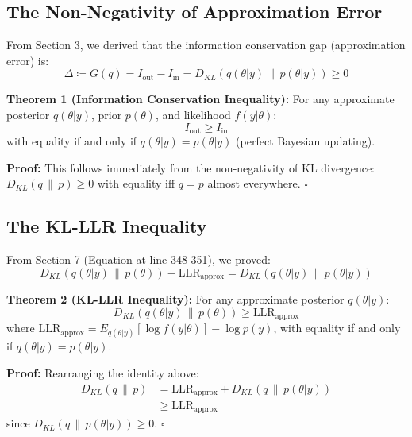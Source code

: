 \documentclass{article}
\theoremstyle{definition}
\begin{document}
\subsection{The Non-Negativity of Approximation Error}

From Section 3, we derived that the information conservation gap (approximation error) is:
\begin{equation}
\Delta \coloneqq G(q) = I_{\text{out}} - I_{\text{in}} = D_{KL}(q(\theta|y) \,\|\, p(\theta|y)) \geq 0
\end{equation}

\textbf{Theorem 1 (Information Conservation Inequality):}
For any approximate posterior $q(\theta|y)$, prior $p(\theta)$, and likelihood $f(y|\theta)$:
\begin{equation}
\boxed{I_{\text{out}} \geq I_{\text{in}}}
\end{equation}
with equality if and only if $q(\theta|y) = p(\theta|y)$ (perfect Bayesian updating).

\textbf{Proof:} This follows immediately from the non-negativity of KL divergence: $D_{KL}(q \,\|\, p) \geq 0$ with equality iff $q = p$ almost everywhere. $\square$

\subsection{The KL-LLR Inequality}

From Section 7 (Equation at line 348-351), we proved:
\begin{equation}
D_{KL}(q(\theta|y) \,\|\, p(\theta)) - \text{LLR}_{\text{approx}} = D_{KL}(q(\theta|y) \,\|\, p(\theta|y))
\end{equation}

\textbf{Theorem 2 (KL-LLR Inequality):}
For any approximate posterior $q(\theta|y)$:
\begin{equation}
\boxed{D_{KL}(q(\theta|y) \,\|\, p(\theta)) \geq \text{LLR}_{\text{approx}}}
\end{equation}
where $\text{LLR}_{\text{approx}} = E_{q(\theta|y)}[\log f(y|\theta)] - \log p(y)$, with equality if and only if $q(\theta|y) = p(\theta|y)$.

\textbf{Proof:} Rearranging the identity above:
\begin{align}
D_{KL}(q \,\|\, p) &= \text{LLR}_{\text{approx}} + D_{KL}(q \,\|\, p(\theta|y)) \\
&\geq \text{LLR}_{\text{approx}}
\end{align}
since $D_{KL}(q \,\|\, p(\theta|y)) \geq 0$. $\square$
\end{document}
